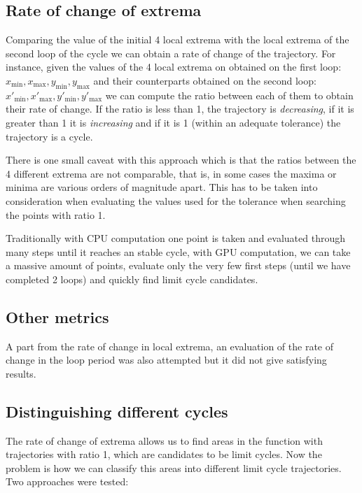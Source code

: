\pagebreak

\subsection{Rate of change of extrema}

Comparing the value of the initial 4 local extrema with the local extrema of the
second loop of the cycle we can obtain a rate of change of the trajectory. For
instance, given the values of the 4 local extrema on obtained on the first loop:
$x_{\min}, x_{\max}, y_{\min}, y_{\max}$ and their counterparts obtained on the second
loop: $x'_{\min}, x'_{\max}, y'_{\min}, y'_{\max}$ we can compute the ratio
between each of them to obtain their rate of change. If the ratio is less than
1, the trajectory is \emph{decreasing}, if it is greater than 1 it is
\emph{increasing} and if it is 1 (within an adequate tolerance) the trajectory
is a cycle.

There is one small caveat with this approach which is that the ratios between
the 4 different extrema are not comparable, that is, in some cases the maxima or
minima are various orders of magnitude apart. This has to be taken into
consideration when evaluating the values used for the tolerance when searching
the points with ratio 1.

Traditionally with CPU computation one point is taken and evaluated through many
steps until it reaches an stable cycle, with GPU computation, we can take a
massive amount of points, evaluate only the very few first steps (until we have
completed 2 loops) and quickly find limit cycle candidates.

\subsection{Other metrics}

A part from the rate of change in local extrema, an evaluation of the rate of
change in the loop period was also attempted but it did not give satisfying
results.

\subsection{Distinguishing different cycles}

The rate of change of extrema allows us to find areas in the function with
trajectories with ratio 1, which are candidates to be limit cycles. Now the
problem is how we can classify this areas into different limit cycle
trajectories. Two approaches were tested:

